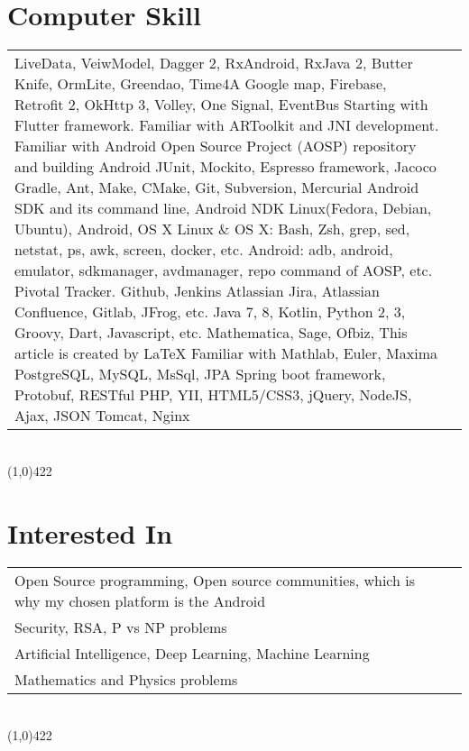 \documentclass[10pt]{article}
\newcommand\HRule{\hspace*{.8cm}\line(1,0){422}\\}
\newenvironment{Record}[1]
{
    \vspace{-0.5cm}
    \section*{#1}
        \vspace{0.1cm}
        \begin{tabular}
}
{
        \end{tabular}\\
        \HRule
}
\newcommand\subsubsectionstyle{\scriptsize\texttt\subsubsectionfont}
\begin{document}
\begin{Record}{Computer Skill}{l l}
    \ComputerSkill{Android Library}
        {LiveData, VeiwModel, Dagger 2, RxAndroid, RxJava 2, Butter Knife, OrmLite, Greendao, Time4A}
        {Google map, Firebase, Retrofit 2, OkHttp 3, Volley, One Signal, EventBus}
        {Starting with Flutter framework. Familiar with ARToolkit and JNI development.}
        {Familiar with Android Open Source Project (AOSP) repository and building Android}{}%
    \ComputerSkill{Android Test Library}
        {JUnit, Mockito, Espresso framework, Jacoco}{}{}{}{}%
    \ComputerSkill{Tool}
        {Gradle, Ant, Make, CMake, Git, Subversion, Mercurial}
        {Android SDK and its command line, Android NDK}{}{}{}%
    \ComputerSkill{Operating System}
        {Linux(Fedora, Debian, Ubuntu), Android, OS X}{}{}{}{}%
    \ComputerSkill{Operating System tool}
        {Linux \& OS X: Bash, Zsh, grep, sed, netstat, ps, awk, screen, docker, etc.}
        {Android: adb, android, emulator, sdkmanager, avdmanager, repo command of AOSP, etc.}{}{}{}%
    \ComputerSkill{Development tool}
        {Pivotal Tracker. Github, Jenkins}
        {Atlassian Jira, Atlassian Confluence, Gitlab, JFrog, etc.}{}{}{}%
    \ComputerSkill{Language}
        {Java 7, 8, Kotlin, Python 2, 3, Groovy, Dart, Javascript, etc.}
        {}{}{}{}%
    \ComputerSkill{Special Software}
        {Mathematica, Sage, Ofbiz, This article is created by \LaTeX}
        {Familiar with Mathlab, Euler, Maxima}{}{}{}%
    \ComputerSkill{Back-End Development}
        {PostgreSQL, MySQL, MsSql, JPA}
        {Spring boot framework, Protobuf, RESTful}
        {PHP, YII, HTML5/CSS3, jQuery, NodeJS, Ajax, JSON}
        {Tomcat, Nginx}{}%
\end{Record}

\newcommand{\InterestedIn}[1]{
    \subsubsectionstyle #1\\
}
\begin{Record}{Interested In}{l l}
    \InterestedIn{Open Source programming, Open source communities, which is why my chosen platform is the Android}%
    \InterestedIn{Security, RSA, P vs NP problems}%
    \InterestedIn{Artificial Intelligence, Deep Learning, Machine Learning}%
    \InterestedIn{Mathematics and Physics problems}%
\end{Record}

\end{document}

